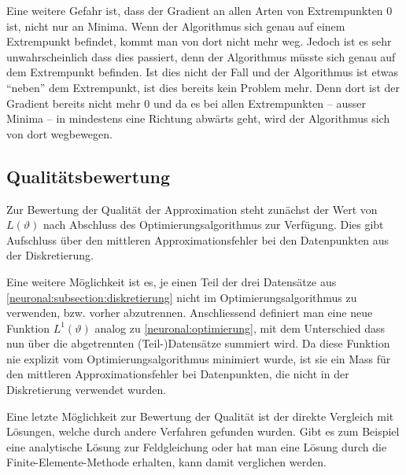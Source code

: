 Eine weitere Gefahr ist, dass der Gradient an allen Arten von Extrempunkten 0 ist, nicht nur an Minima.
Wenn der Algorithmus sich genau auf einem Extrempunkt befindet, kommt man von dort nicht mehr weg.
Jedoch ist es sehr unwahrscheinlich dass dies passiert, denn der Algorithmus müsste sich genau auf dem Extrempunkt befinden.
Ist dies nicht der Fall und der Algorithmus ist etwas ``neben'' dem Extrempunkt, ist dies bereits kein Problem mehr.
Denn dort ist der Gradient bereits nicht mehr 0 und da es bei allen Extrempunkten -- ausser Minima -- in mindestens eine Richtung abwärts geht, wird der Algorithmus sich von dort wegbewegen.


\subsection{Qualitätsbewertung}\label{neuronal:subsection:qualitaetsbewertung}
Zur Bewertung der Qualität der Approximation steht zunächst der Wert von $L(\vartheta)$ nach Abschluss des Optimierungsalgorithmus zur Verfügung.
Dies gibt Aufschluss über den mittleren Approximationsfehler bei den Datenpunkten aus der Diskretierung.

Eine weitere Möglichkeit ist es, je einen Teil der drei Datensätze aus \ref{neuronal:subsection:diskretierung} nicht im Optimierungsalgorithmus zu verwenden, bzw. vorher abzutrennen.
Anschliessend definiert man eine neue Funktion $L^1(\vartheta)$ analog zu \eqref{neuronal:optimierung}, mit dem Unterschied dass nun über die abgetrennten (Teil-)Datensätze summiert wird.
Da diese Funktion nie explizit vom Optimierungsalgorithmus minimiert wurde, ist sie ein Mass für den mittleren Approximationsfehler bei Datenpunkten, die nicht in der Diskretierung verwendet wurden.

Eine letzte Möglichkeit zur Bewertung der Qualität ist der direkte Vergleich mit Lösungen, welche durch andere Verfahren gefunden wurden.
Gibt es zum Beispiel eine analytische Lösung zur Feldgleichung oder hat man eine Lösung durch die Finite-Elemente-Methode erhalten, kann damit verglichen werden.
